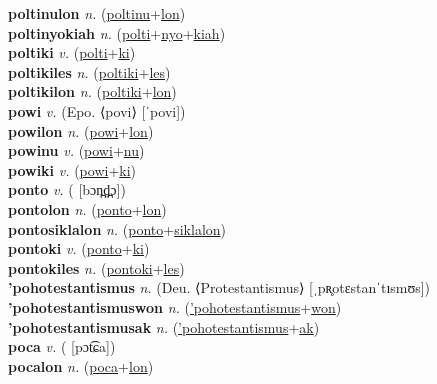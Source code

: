 \textbf{poltinulon} \textit{n.} (\hyperref[poltinu]{poltinu}+\hyperref[lon]{lon})
 \label{poltinulon} \\
\textbf{poltinyokiah} \textit{n.} (\hyperref[polti]{polti}+\hyperref[nyo]{nyo}+\hyperref[kiah]{kiah})
 \label{poltinyokiah} \\
\textbf{poltiki} \textit{v.} (\hyperref[polti]{polti}+\hyperref[ki]{ki})
 \label{poltiki} \\
\textbf{poltikiles} \textit{n.} (\hyperref[poltiki]{poltiki}+\hyperref[les]{les})
 \label{poltikiles} \\
\textbf{poltikilon} \textit{n.} (\hyperref[poltiki]{poltiki}+\hyperref[lon]{lon})
 \label{poltikilon} \\
\textbf{powi} \textit{v.} (Epo. ⟨povi⟩ [ˈpovi])
 \label{powi} \\
\textbf{powilon} \textit{n.} (\hyperref[powi]{powi}+\hyperref[lon]{lon})
 \label{powilon} \\
\textbf{powinu} \textit{v.} (\hyperref[powi]{powi}+\hyperref[nu]{nu})
 \label{powinu} \\
\textbf{powiki} \textit{v.} (\hyperref[powi]{powi}+\hyperref[ki]{ki})
 \label{powiki} \\
\textbf{ponto} \textit{v.} ( [bɔn̪d̪̤ɔ])
 \label{ponto} \\
\textbf{pontolon} \textit{n.} (\hyperref[ponto]{ponto}+\hyperref[lon]{lon})
 \label{pontolon} \\
\textbf{pontosiklalon} \textit{n.} (\hyperref[ponto]{ponto}+\hyperref[siklalon]{siklalon})
 \label{pontosiklalon} \\
\textbf{pontoki} \textit{v.} (\hyperref[ponto]{ponto}+\hyperref[ki]{ki})
 \label{pontoki} \\
\textbf{pontokiles} \textit{n.} (\hyperref[pontoki]{pontoki}+\hyperref[les]{les})
 \label{pontokiles} \\
\textbf{'pohotestantismus} \textit{n.} (Deu. ⟨Protestantismus⟩ [ˌpʀ̥otɛstanˈtɪsmʊs])
 \label{'pohotestantismus} \\
\textbf{'pohotestantismuswon} \textit{n.} (\hyperref['pohotestantismus]{'pohotestantismus}+\hyperref[won]{won})
 \label{'pohotestantismuswon} \\
\textbf{'pohotestantismusak} \textit{n.} (\hyperref['pohotestantismus]{'pohotestantismus}+\hyperref[ak]{ak})
 \label{'pohotestantismusak} \\
\textbf{poca} \textit{v.} ( [pɔt͡ɕa])
 \label{poca} \\
\textbf{pocalon} \textit{n.} (\hyperref[poca]{poca}+\hyperref[lon]{lon})

